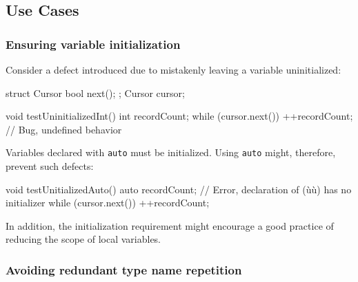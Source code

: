 \subsection[Use Cases]{Use Cases}\label{use-cases-auto}

\subsubsection[Ensuring variable initialization]{Ensuring variable initialization}\label{ensuring-variable-initialization}

Consider a defect introduced due to mistakenly leaving a variable
uninitialized:

\begin{emcppshiddenlisting}[emcppsbatch=e4]
struct Cursor {
    bool next();
};
Cursor cursor;
\end{emcppshiddenlisting}
\begin{emcppslisting}[emcppsbatch=e4]
void testUninitializedInt()
{
    int recordCount;
    while (cursor.next()) { ++recordCount; }  // Bug, undefined behavior
}
\end{emcppslisting}
    
\noindent Variables declared with \lstinline!auto! must be initialized. Using
\lstinline!auto! might, therefore, prevent such defects:

\begin{emcppslisting}[emcppsbatch=e4,emcppserrorlines={4}]
void testUnitializedAuto()
{
    auto recordCount; // Error, declaration of (ù{}ù) has no initializer
    while (cursor.next()) { ++recordCount; }
}
\end{emcppslisting}
    
\noindent In addition, the initialization requirement might encourage a good
practice of reducing the scope of local variables.

\subsubsection[Avoiding redundant type name repetition]{Avoiding redundant type name repetition}\label{avoiding-redundant-type-name-repetition}

